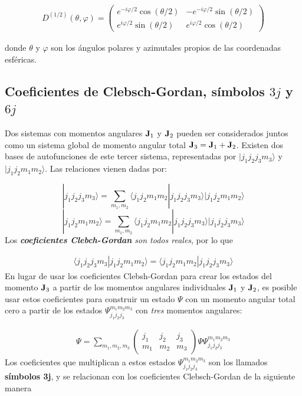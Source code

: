 \begin{eqnarray}
	D^{(1/2)}(\theta,\varphi) = \begin{pmatrix}
		e^{-i\varphi/2} \cos (\theta/2)  & 	-e^{-i\varphi/2} \sin (\theta/2) \\
		e^{i\varphi/2} \sin (\theta/2) & 	e^{i\varphi/2} \cos (\theta/2)
	\end{pmatrix}
\end{eqnarray}

donde $\theta$ y $\varphi$ son los ángulos polares y azimutales propios de las coordenadas esféricas.


\subsection{Coeficientes de Clebsch-Gordan, símbolos $3j$ y $6j$}

Dos sistemas con momentos angulares $\mathbf{J}_1$ y $\mathbf{J}_2$ pueden ser considerados juntos como un sistema global de momento angular total $\mathbf{J}_3 = \mathbf{J}_1 + \mathbf{J}_2$. Existen dos bases de autofunciones de este tercer sistema, representadas por $|j_1 j_2 j_3 m_3\rangle$ y $|j_1 j_2 m_1 m_2\rangle$. Las relaciones vienen dadas por:

\begin{equation}
   |j_1 j_2 j_3 m_3 \rangle  = \sum_{m_1, m_2}  \langle j_1 j_2 m_1 m_2 | j_1 j_2 j_3 m_3 \rangle    |j_1 j_2 m_1 m_2\rangle
\end{equation}
\begin{equation}
	|j_1 j_2 m_1 m_2\rangle= \sum_{m_1, m_2} \langle j_1 j_2 m_1 m_2 | j_1 j_2 j_3 m_3 \rangle    |j_1 j_2 j_3 m_3 \rangle
\end{equation}
Los \textit{\textbf{coeficientes Clebch-Gordan} son todos reales}, por lo que 

\begin{eqnarray}
	 \langle  j_1 j_2 j_3 m_3 |  j_1 j_2 m_1 m_2\rangle  = \langle j_1 j_2 m_1 m_2 | j_1 j_2 j_3 m_3 \rangle   
\end{eqnarray}
En lugar de usar los coeficientes Clebsh-Gordan para crear los estados del momento $\mathbf{J}_3$ a partir de los momentos angulares individuales $\mathbf{J}_1$ y $\mathbf{J}_2$, es posible usar estos coeficientes para construir un estado $\Psi$ con un momento angular total cero a partir de los estados $\Psi_{j_1j_2j_3}^{m_1m_2m_3}$ con \textit{tres} momentos angulares:

\begin{eqnarray}
	\Psi = \sum_{m_1,m_2,m_3} \begin{pmatrix}
		j_1 & j_2 & j_3 \\ m_1 & m_2 & m_3
	\end{pmatrix} \Psi \Psi_{j_1j_2j_3}^{m_1m_2m_3}
\end{eqnarray}
Los coeficientes que multiplican a estos estados $\Psi_{j_1j_2j_3}^{m_1m_2m_3}$ son los llamados \textbf{símbolos 3j}, y se relacionan con los coeficientes Clebsch-Gordan de la siguiente manera

